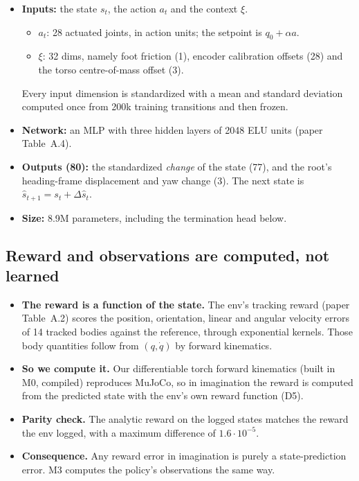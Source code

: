\documentclass[10pt]{article}
\begin{document}
\begin{itemize}
  \item \textbf{Inputs:} the state $s_t$, the action $a_t$ and the context $\xi$.
  \begin{itemize}
    \item $a_t$: 28 actuated joints, in action units; the setpoint is $q_0 + \alpha a$.
    \item $\xi$: 32 dims, namely foot friction (1), encoder calibration offsets (28) and the torso
    centre-of-mass offset (3).
  \end{itemize}
  Every input dimension is standardized with a mean and standard deviation computed once from 200k
  training transitions and then frozen.
  \item \textbf{Network:} an MLP with three hidden layers of 2048 ELU units (paper Table~A.4).
  \item \textbf{Outputs (80):} the standardized \emph{change} of the state (77), and the root's
  heading-frame displacement and yaw change (3). The next state is $\hat s_{t+1} = s_t + \Delta\hat s_t$.
  \item \textbf{Size:} 8.9M parameters, including the termination head below.
\end{itemize}

\subsection{Reward and observations are computed, not learned}

\begin{itemize}
  \item \textbf{The reward is a function of the state.} The env's tracking reward (paper Table~A.2)
  scores the position, orientation, linear and angular velocity errors of 14 tracked bodies against the
  reference, through exponential kernels. Those body quantities follow from $(q, \dot q)$ by forward
  kinematics.
  \item \textbf{So we compute it.} Our differentiable torch forward kinematics (built in M0, compiled)
  reproduces MuJoCo, so in imagination the reward is computed from the predicted state with the env's
  own reward function (D5).
  \item \textbf{Parity check.} The analytic reward on the logged states matches the reward the env
  logged, with a maximum difference of $1.6\cdot10^{-5}$.
  \item \textbf{Consequence.} Any reward error in imagination is purely a state-prediction error. M3
  computes the policy's observations the same way.
\end{itemize}
\end{document}
